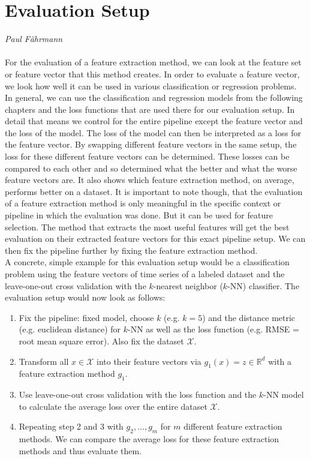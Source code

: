 \section{Evaluation Setup}
\vspace*{-15mm}
\hfill{\normalsize\emph{Paul Fährmann}}
\label{sec:feature-extraction:evaluation-setup}
\\\\
For the evaluation of a feature extraction method, we can look at the feature set or feature vector that this method creates. In order to evaluate a feature vector, we look how well it can be used in various classification or regression problems.\\
In general, we can use the classification and regression models from the following chapters and the loss functions that are used there for our evaluation setup.
In detail that means we control for the entire pipeline except the feature vector and the loss of the model. The loss of the model can then be interpreted as a loss for the feature vector. By swapping different feature vectors in the same setup, the loss for these different feature vectors can be determined. These losses can be compared to each other and so determined what the better and what the worse feature vectors are. It also shows which feature extraction method, on average, performs better on a dataset.
It is important to note though, that the evaluation of a feature extraction method is only meaningful in the specific context or pipeline in which the evaluation was done.
But it can be used for feature selection. The method that extracts the most useful features will get the best evaluation on their extracted feature vectors for this exact pipeline setup. We can then fix the pipeline further by fixing the feature extraction method.\\
A concrete, simple example for this evaluation setup would be a classification problem using the feature vectors of time series of a labeled dataset and the leave-one-out cross validation 
with the $k$-nearest neighbor ($k$-NN) classifier. The evaluation setup would now look as follows:
\begin{enumerate}
	\item Fix the pipeline: fixed model, choose $k$ (e.g. $k = 5$) and the distance metric (e.g. euclidean distance)  for $k$-NN as well as the loss function (e.g. RMSE = root mean square error). Also fix the dataset $\mathcal{X}$.
	\item Transform all $x \in \mathcal{X}$ into their feature vectors via $g_1(x) = z \in \mathbb{R}^d$ with a feature extraction method $g_1$.
	\item Use leave-one-out cross validation with the loss function and the $k$-NN model to calculate the average loss over the entire dataset $\mathcal{X}$.
	\item Repeating step 2 and 3 with $g_2, \dots, g_m$ for $m$ different feature extraction methods. We can compare the average loss for these feature extraction methods and thus evaluate them.
\end{enumerate}
